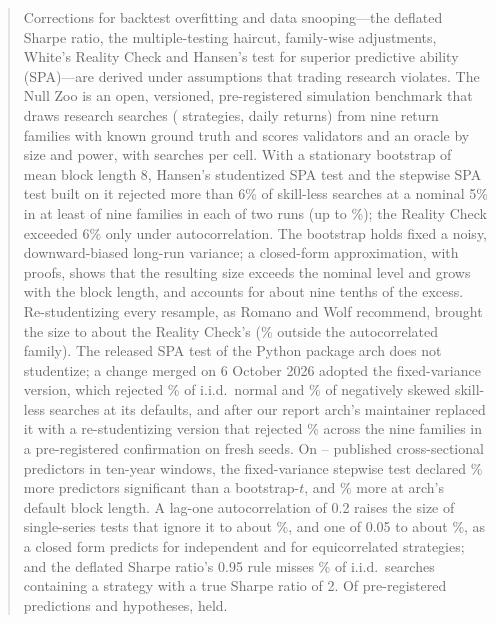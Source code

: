 \begin{abstract}
\noindent Corrections for backtest overfitting and data snooping---the deflated Sharpe ratio, the multiple-testing haircut, family-wise adjustments, White's Reality Check and Hansen's test for superior predictive ability (SPA)---are derived under assumptions that trading research violates. The Null Zoo is an open, versioned, pre-registered simulation benchmark that draws research searches ( strategies,  daily returns) from nine return families with known ground truth and scores  validators and an oracle by size and power, with  searches per cell. With a stationary bootstrap of mean block length 8, Hansen's studentized SPA test and the stepwise SPA test built on it rejected more than 6\% of skill-less searches at a nominal 5\% in at least  of nine families in each of two runs (up to \%); the Reality Check exceeded 6\% only under autocorrelation. The bootstrap holds fixed a noisy, downward-biased long-run variance; a closed-form approximation, with proofs, shows that the resulting size exceeds the nominal level and grows with the block length, and accounts for about nine tenths of the excess. Re-studentizing every resample, as Romano and Wolf recommend, brought the size to about the Reality Check's (\% outside the autocorrelated family). The released SPA test of the Python package arch does not studentize; a change merged on 6 October 2026 adopted the fixed-variance version, which rejected \% of i.i.d.\ normal and \% of negatively skewed skill-less searches at its defaults, and after our report arch's maintainer replaced it with a re-studentizing version that rejected \% across the nine families in a pre-registered confirmation on fresh seeds. On -- published cross-sectional predictors in  ten-year windows, the fixed-variance stepwise test declared \% more predictors significant than a bootstrap-$t$, and \% more at arch's default block length. A lag-one autocorrelation of 0.2 raises the size of single-series tests that ignore it to about \%, and one of 0.05 to about \%, as a closed form predicts for independent and for equicorrelated strategies; and the deflated Sharpe ratio's 0.95 rule misses \% of i.i.d.\ searches containing a strategy with a true Sharpe ratio of 2. Of  pre-registered predictions and hypotheses,  held.
\end{abstract}
